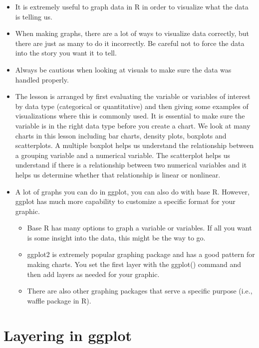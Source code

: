 \documentclass[
  letterpaper,
  DIV=11,
  numbers=noendperiod]{scrreprt}
\providecommand{\tightlist}{%
  \setlength{\itemsep}{0pt}\setlength{\parskip}{0pt}}\usepackage{longtable,booktabs,array}
\begin{document}
\begin{itemize}
\item
  It is extremely useful to graph data in R in order to visualize what
  the data is telling us.
\item
  When making graphs, there are a lot of ways to visualize data
  correctly, but there are just as many to do it incorrectly. Be careful
  not to force the data into the story you want it to tell.
\item
  Always be cautious when looking at visuals to make sure the data was
  handled properly.
\item
  The lesson is arranged by first evaluating the variable or variables
  of interest by data type (categorical or quantitative) and then giving
  some examples of visualizations where this is commonly used. It is
  essential to make sure the variable is in the right data type before
  you create a chart. We look at many charts in this lesson including
  bar charts, density plots, boxplots and scatterplots. A multiple
  boxplot helps us understand the relationship between a grouping
  variable and a numerical variable. The scatterplot helps us understand
  if there is a relationship between two numerical variables and it
  helps us determine whether that relationship is linear or nonlinear.
\item
  A lot of graphs you can do in ggplot, you can also do with base R.
  However, ggplot has much more capability to customize a specific
  format for your graphic.

  \begin{itemize}
  \tightlist
  \item
    Base R has many options to graph a variable or variables. If all you
    want is some insight into the data, this might be the way to go.
  \item
    ggplot2 is extremely popular graphing package and has a good pattern
    for making charts. You set the first layer with the ggplot() command
    and then add layers as needed for your graphic.
  \item
    There are also other graphing packages that serve a specific purpose
    (i.e., waffle package in R).
  \end{itemize}
\end{itemize}

\section{Layering in ggplot}\label{layering-in-ggplot}
\end{document}
